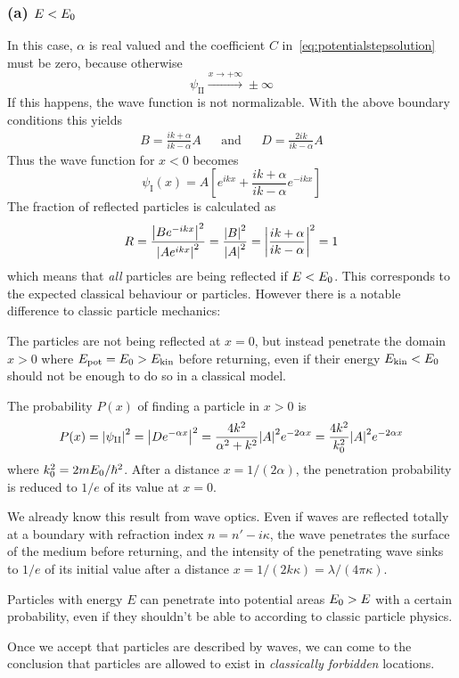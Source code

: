 \documentclass[../../script.tex]{subfiles}
\begin{document}
\subsubsection{(a) $E < E_{\text{0}}$}
In this case, $\alpha$ is real valued and the coefficient $C$ in~\eqref{eq:potentialstepsolution} must be zero, because otherwise
\[
	\psi_{\text{II}} \xrightarrow{x \rightarrow +\infty} \pm\infty
\]
If this happens, the wave function is not normalizable. With the above boundary conditions this yields
\begin{align}
	B = \frac{ik + \alpha}{ik - \alpha}A && \text{and} && D = \frac{2ik}{ik - \alpha} A
\end{align}
Thus the wave function for $x < 0$ becomes 
\begin{equation}
	\psi_{\text{I}}(x) = A \left[ e^{ikx} + \frac{ik + \alpha}{ik - \alpha}e^{-ikx} \right]
\end{equation}
The fraction of reflected particles is calculated as 
\begin{equation}
	R = \frac{\abs{Be^{-ikx}}^2}{\abs{Ae^{ikx}}^2} = \frac{\abs{B}^2}{\abs{A}^2} = \abs{\frac{ik + \alpha}{ik - \alpha}}^2 = 1
\end{equation}
which means that \textit{all} particles are being reflected if $E < E_{\text{0}}$. This corresponds to the expected classical behaviour or particles.
However there is a notable difference to classic particle mechanics:
\begin{tcolorbox}
	The particles are not being reflected at $x = 0$, but instead penetrate the domain $x > 0$ where $E_{\text{pot}} = E_{\text{0}} > E_{\text{kin}}$ before returning,
	even if their energy $E_{\text{kin}} < E_{\text{0}}$ should not be enough to do so in a classical model.
\end{tcolorbox}
The probability $P(x)$ of finding a particle in $x > 0$ is 
\begin{equation}
	P(x) = \abs{\psi_{\text{II}}}^2 = \abs{De^{-\alpha x}}^2 = \frac{4k^2}{\alpha^2 + k^2} \abs{A}^2 e^{-2\alpha x} = \frac{4k^2}{k_0^2} \abs{A}^2 e^{-2\alpha x}
\end{equation}
where $k_0^2 = 2mE_{\text{0}} / \hbar^2$. After a distance $x = 1/(2\alpha)$, the penetration probability is reduced to $1/e$ of its value at $x = 0$.

We already know this result from wave optics. Even if waves are reflected totally at a boundary with refraction index $n = n' - i\kappa$, the wave penetrates the surface of the medium before returning, and the intensity
of the penetrating wave sinks to $1/e$ of its initial value after a distance $x = 1/(2k\kappa) = \lambda/(4\pi\kappa)$.
\begin{tcolorbox}
	Particles with energy $E$ can penetrate into potential areas $E_{\text{0}} > E$ with a certain probability, even if they shouldn't be able to according to classic particle physics.
\end{tcolorbox}
Once we accept that particles are described by waves, we can come to the conclusion that particles are allowed to exist in \textit{classically forbidden} locations.
\end{document}
